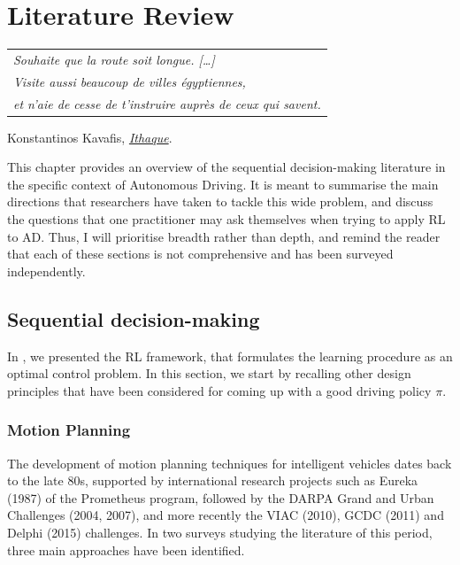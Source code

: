 
\graphicspath{{2-Chapters/2-Chapter/}}

\chapter{Literature Review}
\label{chapter:2}

\begin{flushright}
	\begin{tabular}{@{}l@{}}
		\emph{Souhaite que la route soit longue. [\dots]}\\
		\emph{Visite aussi beaucoup de villes égyptiennes,}\\
		\emph{et n’aie de cesse de t’instruire auprès de ceux qui savent.}\\
	\end{tabular}
	
	Konstantinos Kavafis, \href{https://eleurent.github.io/sisyphe/texts/ithaki.html}{\emph{Ithaque}}.
\end{flushright}

\abstractStartChapter{}%
This chapter provides an overview of the sequential decision-making literature in the specific context of Autonomous Driving. It is meant to summarise the main directions that researchers have taken to tackle this wide problem, and discuss the questions that one practitioner may ask themselves when trying to apply \acl*{RL} to \acl*{AD}. Thus, I will prioritise breadth rather than depth, and remind the reader that each of these sections is not comprehensive and has been surveyed independently.
\minitocStartChapter{}

\section{Sequential decision-making}
\label{sec:sequential-decision-making}

In , we presented the \acl*{RL} framework, that formulates the learning procedure as an optimal control problem. In this section, we start by recalling other design principles that have been considered for coming up with a good driving policy $\pi$.

\subsection{Motion Planning}

The development of motion planning techniques for intelligent vehicles dates back to the late 80s, supported by international research projects such as Eureka (1987) of the Prometheus program, followed by the DARPA Grand and Urban Challenges (2004, 2007), and more recently the VIAC (2010), GCDC (2011) and Delphi (2015) challenges. In two surveys \citep{Gonzalez2016,Paden2016} studying the literature of this period, three main approaches have been identified.

